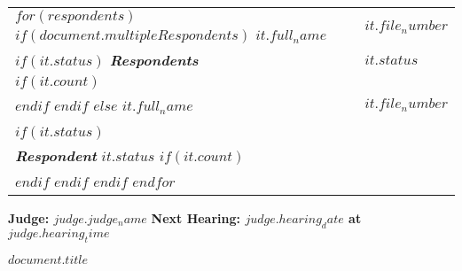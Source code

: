 \documentclass[12pt]{letter}
\begin{document}
\begin{letter}{}
\begin{flushleft}
\begin{tabular}{ p{} | p{} }
      $for(respondents)$
        $if(document.multipleRespondents)$
          \textbf{$it.full_name$} & \textbf{\hspace{1em}$it.file_number$} \\
          $if(it.status)$ 
            \textit{\textbf{Respondents}} & \textbf{$it.status$} \\
            $if(it.count)$ 
              & \\
            $endif$
          $endif$
        $else$
          \textbf{$it.full_name$} & \textbf{\hspace{1em}$it.file_number$} \\ \\
          $if(it.status)$ 
            \vspace{.0em} & \\ 
            \textit{\textbf{Respondent}} 
            \textbf{$it.status$}
            $if(it.count)$ 
              \vspace{.25em} & \\
            $endif$
          $endif$
        $endif$    
      $endfor$

    \end{tabular}
\end{flushleft}
\makebox[0.5\textwidth]{\hrulefill}

  \vspace{2em}
  
  \begin{flushleft}
    \textbf{Judge: $judge.judge_name$} \hfill \textbf{Next Hearing: $judge.hearing_date$ at $judge.hearing_time$}
  \end{flushleft}

  \vspace{2em}
  
  \begin{center}
    \textbf{$document.title$}
  \end{center}

\end{letter}
\end{document}
